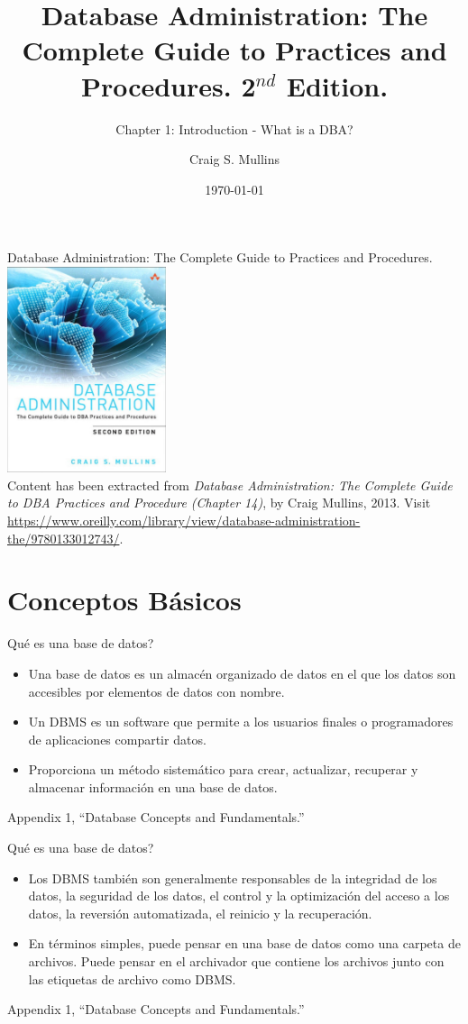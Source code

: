 \documentclass{beamer}
\title[DBA Introduction]{Database Administration: The Complete Guide to Practices and Procedures. 2$^{nd}$ Edition.}
\subtitle{Chapter 1: Introduction - What is a DBA?}
\author{Craig S. Mullins}
\date{\today}
\newcommand{\toRight}[1]{
    \begin{FlushRight}
        {\tiny #1}
    \end{FlushRight}
}
\begin{document}
\frame{\titlepage}

\begin{frame}{Database Administration: The Complete Guide to Practices and Procedures.}
    \centering
    \includegraphics[width=0.35\textwidth]{figures/book_cover}\\
    \vspace{2mm}
    {
        \scriptsize
        Content has been extracted from \textit{Database Administration: The Complete Guide to DBA Practices and Procedure (Chapter 14)}, by Craig Mullins, 2013.  Visit \url{https://www.oreilly.com/library/view/database-administration-the/9780133012743/}.
    }
\end{frame}

\section{Conceptos Básicos}

\begin{frame}{Qué es una base de datos?}
    \begin{itemize}
        \item Una base de datos es un almacén organizado de datos en el que los datos son accesibles por elementos de datos con nombre. 
        \item Un DBMS es un software que permite a los usuarios finales o programadores de aplicaciones compartir datos.
        \item Proporciona un método sistemático para crear, actualizar, recuperar y almacenar información en una base de datos.
    \end{itemize}
    \toRight{Appendix 1, “Database Concepts and Fundamentals.”}
\end{frame}

\begin{frame}{Qué es una base de datos?}
    \begin{itemize}
        \item Los DBMS también son generalmente responsables de la integridad de los datos, la seguridad de los datos, el control y la optimización del acceso a los datos, la reversión automatizada, el reinicio y la recuperación. 
        \item En términos simples, puede pensar en una base de datos como una carpeta de archivos. Puede pensar en el archivador que contiene los archivos junto con las etiquetas de archivo como DBMS.
    \end{itemize}
    \toRight{Appendix 1, “Database Concepts and Fundamentals.”}
\end{frame}
\end{document}
